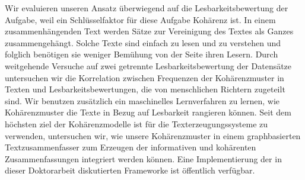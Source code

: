 Wir evaluieren unseren Ansatz überwiegend auf die Lesbarkeitsbewertung der Aufgabe, weil ein Schlüsselfaktor für diese Aufgabe Kohärenz ist.
In einem zusammenhängenden Text werden Sätze zur Vereinigung des Textes als Ganzes zusammengehängt.
Solche Texte sind einfach zu lesen und zu verstehen und folglich benötigen sie weniger Bemühung von der Seite ihren Lesern.
Durch weitgehende Versuche auf zwei getrennte Lesbarkeitsbewertung der Datensätze untersuchen wir die Korrelation zwischen Frequenzen der Kohärenzmuster in Texten und Lesbarkeitsbewertungen, die von menschlichen Richtern zugeteilt sind.
Wir benutzen zusätzlich ein maschinelles Lernverfahren zu lernen, wie Kohärenzmuster die Texte in Bezug auf Lesbarkeit rangieren können.
Seit dem höchsten ziel der Kohärenzmodelle ist für die Texterzeugungssysteme zu verwenden, untersuchen wir, wie unsere Kohärenzmuster in einem graphbasierten Textzusammenfasser zum Erzeugen der informativen und kohärenten Zusammenfassungen integriert werden können. 
Eine Implementierung der in dieser Doktorarbeit diskutierten Frameworke ist öffentlich verfügbar.




